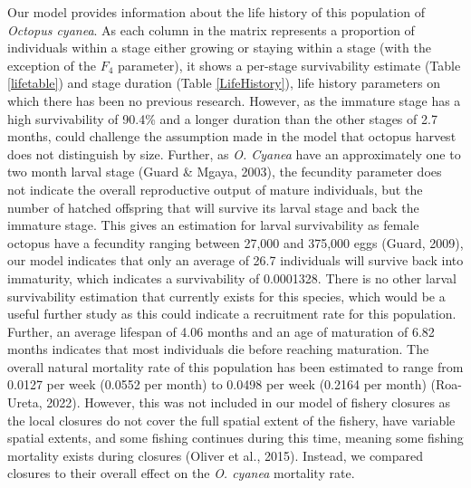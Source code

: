 \documentclass[
]{article}
\begin{document}
Our model provides information about the life history of this population of \emph{Octopus cyanea}. As each column in the matrix represents a proportion of individuals within a stage either growing or staying within a stage (with the exception of the \(F_4\) parameter), it shows a per-stage survivability estimate (Table \ref{lifetable}) and stage duration (Table \ref{LifeHistory}), life history parameters on which there has been no previous research. However, as the immature stage has a high survivability of 90.4\% and a longer duration than the other stages of 2.7 months, could challenge the assumption made in the model that octopus harvest does not distinguish by size. Further, as \emph{O. Cyanea} have an approximately one to two month larval stage (Guard \& Mgaya, 2003), the fecundity parameter does not indicate the overall reproductive output of mature individuals, but the number of hatched offspring that will survive its larval stage and back the immature stage. This gives an estimation for larval survivability as female octopus have a fecundity ranging between 27,000 and 375,000 eggs (Guard, 2009), our model indicates that only an average of 26.7 individuals will survive back into immaturity, which indicates a survivability of 0.0001328. There is no other larval survivability estimation that currently exists for this species, which would be a useful further study as this could indicate a recruitment rate for this population. Further, an average lifespan of 4.06 months and an age of maturation of 6.82 months indicates that most individuals die before reaching maturation. The overall natural mortality rate of this population has been estimated to range from 0.0127 per week (0.0552 per month) to 0.0498 per week (0.2164 per month) (Roa-Ureta, 2022). However, this was not included in our model of fishery closures as the local closures do not cover the full spatial extent of the fishery, have variable spatial extents, and some fishing continues during this time, meaning some fishing mortality exists during closures (Oliver et al., 2015). Instead, we compared closures to their overall effect on the \emph{O. cyanea} mortality rate.
\end{document}
